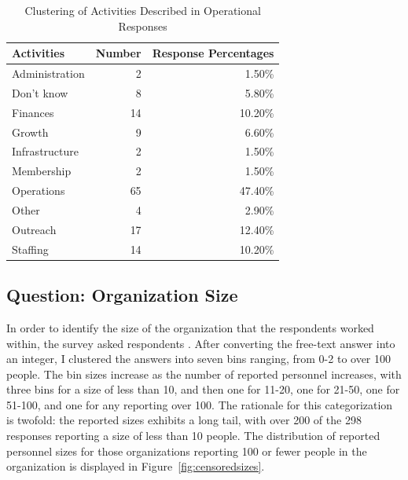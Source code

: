  \begin{table}[ht]
 \centering
 \begin{tabular}{lrr}
   \hline
 Activities & Number & Response Percentages \\
   \hline
  Administration &   2 & 1.50\% \\
    Don’t know &   8 & 5.80\% \\
   Finances &  14 & 10.20\% \\
   Growth &   9 & 6.60\% \\
  Infrastructure &   2 & 1.50\% \\
  Membership &   2 & 1.50\% \\
   Operations &  65 & 47.40\% \\
   Other &   4 & 2.90\% \\
   Outreach &  17 & 12.40\% \\
    Staffing &  14 & 10.20\% \\
    \hline
 \end{tabular}
 \caption{Clustering of Activities Described in Operational Responses}
 \label{tab:activityareas}
 \end{table}

\subsection{Question: Organization Size}

In order to identify the size of the organization that the respondents worked within, the survey asked respondents . After converting the free-text answer into an integer, I clustered the answers into seven bins ranging, from 0-2 to over 100 people. The bin sizes increase as the number of reported personnel increases, with three bins for a size of less than 10, and then one for 11-20, one for 21-50, one for 51-100, and one for any reporting over 100. The rationale for this categorization is twofold: the reported sizes exhibits a long tail, with over 200 of the 298 responses reporting a size of less than 10 people. The distribution of reported personnel sizes for those organizations reporting 100 or fewer people in the organization is displayed in Figure~\ref{fig:censoredsizes}.


